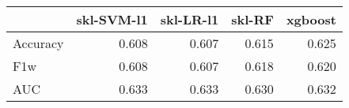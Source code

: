 \begin{tabular}{lrrrr}
\toprule
{} &  skl-SVM-l1 &  skl-LR-l1 &  skl-RF &  xgboost \\
\midrule
Accuracy &       0.608 &      0.607 &   0.615 &    0.625 \\
F1w      &       0.608 &      0.607 &   0.618 &    0.620 \\
AUC      &       0.633 &      0.633 &   0.630 &    0.632 \\
\bottomrule
\end{tabular}

